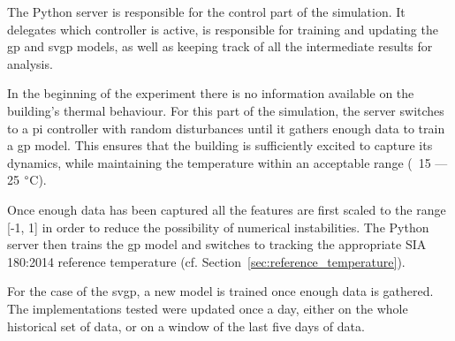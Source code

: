 The Python server is responsible for the control part of the simulation. It
delegates which controller is active, is responsible for training and updating
the \acrshort{gp} and \acrshort{svgp} models, as well as keeping track of all
the intermediate results for analysis.

In the beginning of the experiment there is no information available on the
building's thermal behaviour. For this part of the simulation, the server
switches to a \acrshort{pi} controller with random disturbances until it gathers
enough data to train a \acrshort{gp} model. This ensures that the building is
sufficiently excited to capture its dynamics, while maintaining the temperature
within an acceptable range (~15 --- 25 $\degree$C).

Once enough data has been captured all the features are first scaled to the
range [-1, 1] in order to reduce the possibility of numerical instabilities. The
Python server then trains the \acrshort{gp} model and switches to tracking the
appropriate SIA 180:2014 reference temperature (cf.
Section~\ref{sec:reference_temperature}).

For the case of the \acrshort{svgp}, a new model is trained once enough data is
gathered. The implementations tested were updated once a day, either on the
whole historical set of data, or on a window of the last five days of data.

\clearpage
